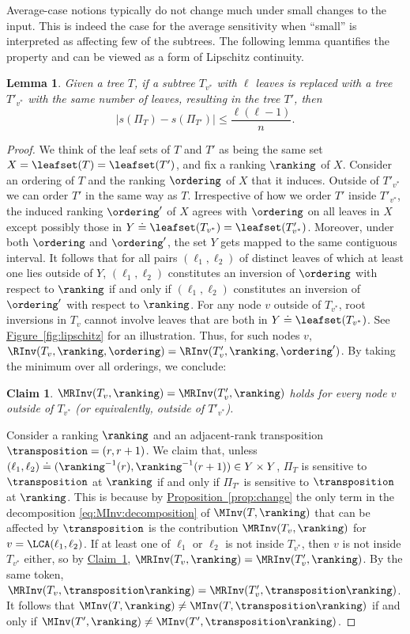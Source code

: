 \documentclass[11pt]{article}
\numberwithin{equation}{section}
\newtheorem{lemma}[theorem]{Lemma}
\newtheorem{claim}[theorem]{Claim}
\theoremstyle{definition}
\theoremstyle{plain}
\newcommand{\expref}[2]{\hyperref[#2]{#1~\ref{#2}}}
\begin{document}
Average-case notions typically do not change much under small changes to the input. This is indeed the case for the average sensitivity when ``small'' is interpreted as affecting few of the subtrees. The following lemma quantifies the property and can be viewed as a form of Lipschitz continuity.
\begin{lemma}
    \label{lemma:sensitivity:lipschitz}    
    Given a tree $T$, if a subtree $T_{v^*}$ with $\ell$ leaves is replaced with a tree $T'_{v^*}$ with the same number of leaves, resulting in the tree $T'$, then
    \[|s(\Pi_T)-s(\Pi_{T'})| \le \frac{\ell(\ell-1)}{n}. \]
\end{lemma}
\begin{proof}
We think of the leaf sets of $T$ and $T'$ as being the same set $X=\leafset(T)=\leafset(T')$, and fix a ranking $\ranking$ of $X$. Consider an ordering of $T$ and the ranking $\ordering$ of $X$ that it induces. Outside of $T'_{v^*}$ we can order $T'$ in the same way as $T$. Irrespective of how we order $T'$ inside $T'_{v^*}$, the induced ranking $\ordering'$ of $X$ agrees with $\ordering$ on all leaves in $X$ except possibly those in $Y \doteq \leafset(T_{v^*})=\leafset(T'_{v^*})$. Moreover, under both $\ordering$ and $\ordering'$, the set $Y$ gets mapped to the same contiguous interval. It follows that for all pairs $(\ell_1,\ell_2)$ of distinct leaves of which at least one lies outside of $Y$, $(\ell_1,\ell_2)$ constitutes an inversion of $\ordering$ with respect to $\ranking$ if and only if $(\ell_1,\ell_2)$ constitutes an inversion of $\ordering'$ with respect to $\ranking$. For any node $v$ outside of $T_{v^*}$, root inversions in $T_v$ cannot involve leaves that are both in $Y \doteq \leafset(T_{v^*})$. See \expref{Figure}{fig:lipschitz} for an illustration. Thus, for such nodes $v$, $\RInv(T_v,\ranking,\ordering) = \RInv(T'_v,\ranking,\ordering')$. By taking the minimum over all orderings, we conclude:
\begin{claim}\label{claim:root:insensitive}
$\MRInv(T_v,\ranking) = \MRInv(T'_v,\ranking)$ holds for every node $v$ outside of $T_{v^*}$ (or equivalently, outside of $T'_{v^*}$).
\end{claim}

Consider a ranking $\ranking$ and an adjacent-rank transposition $\transposition=(r,r+1)$. We claim that, unless $(\ell_1,\ell_2) \doteq (\ranking^{-1}(r),\ranking^{-1}(r+1)) \in Y \times Y$, $\Pi_T$ is sensitive to $\transposition$ at $\ranking$ if and only if $\Pi_{T'}$ is sensitive to $\transposition$ at $\ranking$. This is because by \expref{Proposition}{prop:change} the only term in the decomposition \eqref{eq:MInv:decomposition} of $\MInv(T,\ranking)$ that can be affected by $\transposition$ is the contribution $\MRInv(T_v,\ranking)$ for $v = \LCA(\ell_1,\ell_2)$. If at least one of $\ell_1$ or $\ell_2$ is not inside $T_{v^*}$, then $v$ is not inside $T_{v^*}$ either, so by \expref{Claim}{claim:root:insensitive}, $\MRInv(T_v,\ranking) = \MRInv(T'_v,\ranking)$. By the same token, $\MRInv(T_v,\transposition \ranking) = \MRInv(T'_v,\transposition \ranking)$. It follows that $\MInv(T,\ranking) \ne \MInv(T,\transposition \ranking)$ if and only if $\MInv(T',\ranking) \ne \MInv(T',\transposition \ranking)$.


\end{proof}
\end{document}
